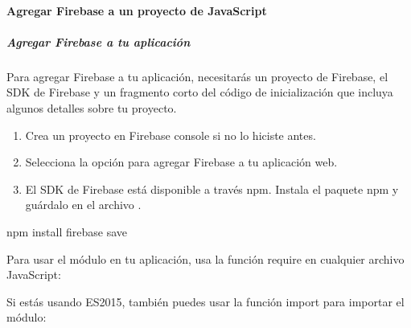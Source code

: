 \paragraph{Agregar Firebase a un proyecto de JavaScript}
\label{\detokenize{firebase_web:agregar-firebase-a-un-proyecto-de-javascript}}

\subparagraph{Agregar Firebase a tu aplicación}
\label{\detokenize{firebase_web:agregar-firebase-a-tu-aplicacion}}
Para agregar Firebase a tu aplicación, necesitarás un proyecto de Firebase, el SDK de Firebase y un fragmento corto del código de inicialización que incluya algunos detalles sobre tu proyecto.
\begin{enumerate}
\item {} 
Crea un proyecto en Firebase console si no lo hiciste antes.

\item {} 
Selecciona la opción para agregar Firebase a tu aplicación web.

\item {} 
El SDK de Firebase está disponible a través npm. Instala el paquete npm  y guárdalo en el archivo .

\end{enumerate}

%
\begin{sphinxVerbatim}[commandchars=\\\{\}]
npm install firebase \PYGZhy{}\PYGZhy{}save
\end{sphinxVerbatim}

Para usar el módulo en tu aplicación, usa la función require en cualquier archivo JavaScript:

%
\begin{sphinxVerbatim}[commandchars=\\\{\}]
   
\end{sphinxVerbatim}

Si estás usando ES2015, también puedes usar la función import para importar el módulo:

%
\begin{sphinxVerbatim}[commandchars=\\\{\}]
     
\end{sphinxVerbatim}

